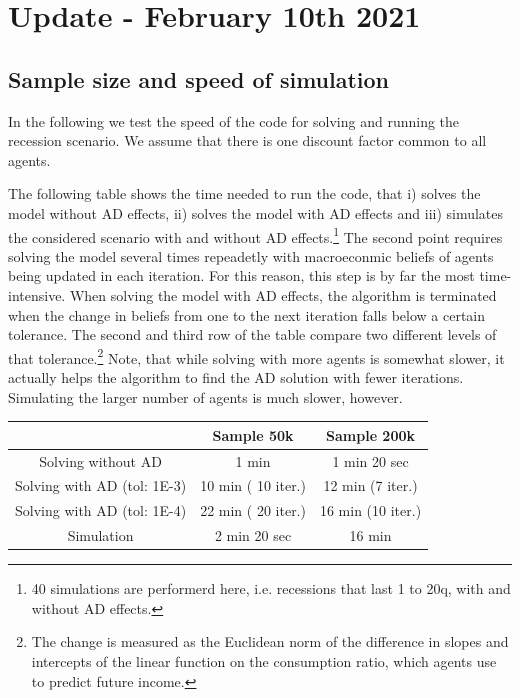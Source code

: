 \documentclass[]{article}
\begin{document}
\section{Update - February 10th 2021}	
	
	
\subsection{Sample size and speed of simulation}

In the following we test the speed of the code for solving and running the recession scenario. We assume that there is one discount factor common to all agents.

The following table shows the time needed to run the code, that i) solves the model without AD effects, ii) solves the model with AD effects and iii) simulates the considered scenario with and without AD effects.\footnote{40 simulations are performerd here, i.e. recessions that last 1 to 20q, with and without AD effects.} The second point requires solving the model several times repeadetly with macroeconmic beliefs of agents being updated in each iteration. For this reason, this step is by far the most time-intensive. When solving the model with AD effects, the algorithm is terminated when the change in beliefs from one to the next iteration falls below a certain tolerance. The second and third row of the table compare two different levels of that tolerance.\footnote{The change is measured as the Euclidean norm of the difference in slopes and intercepts of the linear function on the consumption ratio, which agents use to predict future income.} Note, that while solving with more agents is somewhat slower, it actually helps the algorithm to find the AD solution with fewer iterations. Simulating the larger number of agents is much slower, however.

\begin{center}
	\begin{tabular}{||c| c |c||} 
		\hline
		  & Sample 50k & Sample 200k \\ [0.5ex] 
		\hline\hline
		Solving without AD &  1 min & 1 min 20 sec  \\ \hline
		Solving with AD (tol: 1E-3) &  10 min ( 10 iter.)  & 12 min (7 iter.)  \\ \hline
		Solving with AD (tol: 1E-4) &  22 min ( 20 iter.)  & 16 min (10 iter.)  \\ \hline
		Simulation & 2 min 20 sec  & 16 min \\ [1ex] 
		\hline
	\end{tabular}
\end{center}
\end{document}

